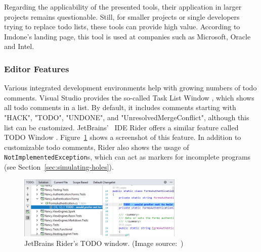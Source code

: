 Regarding the applicability of the presented tools, their application in larger projects remains questionable.
Still, for smaller projects or single developers trying to replace todo lists, these tools can provide high value.
According to Imdone's landing page, this tool is used at companies such as Microsoft, Oracle and Intel.

\subsubsection{Editor Features}
\label{sec:todo-comments-ide-features}
Various integrated development environments help with growing numbers of todo comments.
Visual Studio provides the so-called Task List Window \cite{hogensen_use_2019}, which shows all todo comments in a list.
By default, it includes comments starting with "HACK", "TODO", "UNDONE", and "UnresolvedMergeConflict", although this list can be customized.
JetBrains' \CS\ IDE Rider offers a similar feature called TODO Window \cite{jetbrains_todo_2023}.
Figure~\ref{fig:rider-todo-list} shows a screenshot of this feature.
In addition to customizable todo comments, Rider also shows the usage of \texttt{NotImplementedException}s, which can act as markers for incomplete programs (see Section~\ref{sec:simulating-holes}).
%
\begin{figure}
    \centering
    \includegraphics[width=0.7\textwidth]{images/rider-todo-window}
    \caption{JetBrains Rider's TODO window. (Image source:~\cite{searls_todo_2023})}
    \label{fig:rider-todo-list}
\end{figure}

